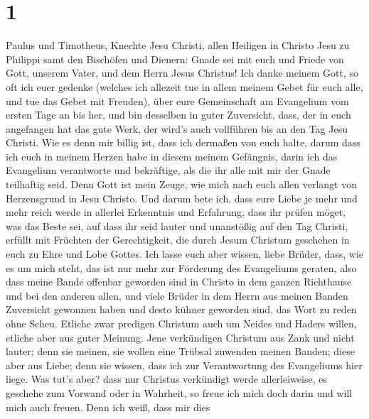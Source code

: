 \hypertarget{section}{%
\section{1}\label{section}}

 Paulus und Timotheus, Knechte Jesu Christi, allen
Heiligen in Christo Jesu zu Philippi samt den Bischöfen und Dienern:
 Gnade sei mit euch und Friede von Gott, unserem Vater,
und dem Herrn Jesus Christus!  Ich danke meinem Gott, so
oft ich euer gedenke  (welches ich allezeit tue in allem
meinem Gebet für euch alle, und tue das Gebet mit Freuden),
 über eure Gemeinschaft am Evangelium vom ersten Tage an
bis her,  und bin desselben in guter Zuversicht, dass, der
in euch angefangen hat das gute Werk, der wird's auch vollführen bis an
den Tag Jesu Christi.  Wie es denn mir billig ist, dass
ich dermaßen von euch halte, darum dass ich euch in meinem Herzen habe
in diesem meinem Gefängnis, darin ich das Evangelium verantworte und
bekräftige, als die ihr alle mit mir der Gnade teilhaftig seid.
 Denn Gott ist mein Zeuge, wie mich nach euch allen
verlangt von Herzensgrund in Jesu Christo.  Und darum bete
ich, dass eure Liebe je mehr und mehr reich werde in allerlei Erkenntnis
und Erfahrung,  dass ihr prüfen möget, was das Beste sei,
auf dass ihr seid lauter und unanstößig auf den Tag Christi,
 erfüllt mit Früchten der Gerechtigkeit, die durch Jesum
Christum geschehen in euch zu Ehre und Lobe Gottes.  Ich
lasse euch aber wissen, liebe Brüder, dass, wie es um mich steht, das
ist nur mehr zur Förderung des Evangeliums geraten,  also
dass meine Bande offenbar geworden sind in Christo in dem ganzen
Richthause und bei den anderen allen,  und viele Brüder
in dem Herrn aus meinen Banden Zuversicht gewonnen haben und desto
kühner geworden sind, das Wort zu reden ohne Scheu. 
Etliche zwar predigen Christum auch um Neides und Haders willen, etliche
aber aus guter Meinung.  Jene verkündigen Christum aus
Zank und nicht lauter; denn sie meinen, sie wollen eine Trübsal zuwenden
meinen Banden;  diese aber aus Liebe; denn sie wissen,
dass ich zur Verantwortung des Evangeliums hier liege. 
Was tut's aber? dass nur Christus verkündigt werde allerleiweise, es
geschehe zum Vorwand oder in Wahrheit, so freue ich mich doch darin und
will mich auch freuen.  Denn ich weiß, dass mir dies
